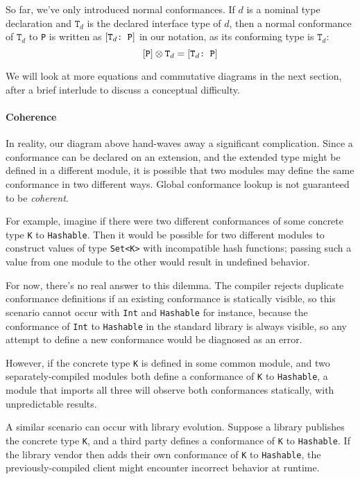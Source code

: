 \documentclass[../generics]{subfiles}
\begin{document}
\newcommand{\NormalConf}{\ConfReq{$\texttt{T}_d$}{P}}

So far, we've only introduced normal conformances. If $d$ is a nominal type declaration and $\texttt{T}_d$ is the declared interface type of $d$, then a normal conformance of $\texttt{T}_d$ to \texttt{P} is written as $\NormalConf$ in our notation, as its conforming type is $\texttt{T}_d$:
\[\protosym{P}\otimes\texttt{T}_d=\NormalConf\]

We will look at more equations and commutative diagrams in the next section, after a brief interlude to discuss a conceptual difficulty.

\paragraph{Coherence} In reality, our diagram above hand-waves away a significant complication. Since a conformance can be declared on an extension, and the extended type might be defined in a different module, it is possible that two modules may define the same conformance in two different ways. Global conformance lookup is not guaranteed to be \emph{coherent}.

For example, imagine if there were two different conformances of some concrete type \texttt{K} to \texttt{Hashable}. Then it would be possible for two different modules to construct values of type \texttt{Set<K>} with incompatible hash functions; passing such a value from one module to the other would result in undefined behavior.

For now, there's no real answer to this dilemma. The compiler rejects duplicate conformance definitions if an existing conformance is statically visible, so this scenario cannot occur with \texttt{Int} and \texttt{Hashable} for instance, because the conformance of \texttt{Int} to \texttt{Hashable} in the standard library is always visible, so any attempt to define a new conformance would be diagnosed as an error.

However, if the concrete type \texttt{K} is defined in some common module, and two separately-compiled modules both define a conformance of \texttt{K} to \texttt{Hashable}, a module that imports all three will observe both conformances statically, with unpredictable results.

A similar scenario can occur with library evolution. Suppose a library publishes the concrete type \texttt{K}, and a third party defines a conformance of \texttt{K} to \texttt{Hashable}. If the library vendor then adds their own conformance of \texttt{K} to \texttt{Hashable}, the previously-compiled client might encounter incorrect behavior at runtime.
\end{document}
